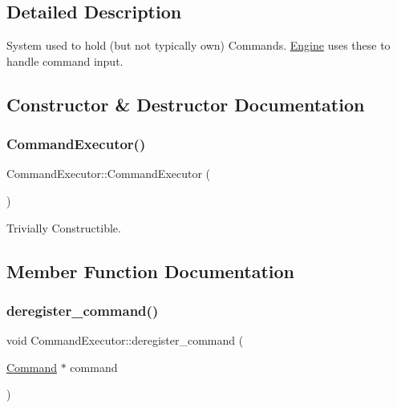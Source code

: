 \subsection{Detailed Description}
System used to hold (but not typically own) Commands. \mbox{\hyperlink{class_engine}{Engine}} uses these to handle command input. 

\subsection{Constructor \& Destructor Documentation}
\mbox{\label{class_command_executor_aad0efdb2a1882ae006083e69de948dee}} 
\subsubsection{\texorpdfstring{Command\+Executor()}{CommandExecutor()}}
{\footnotesize\ttfamily Command\+Executor\+::\+Command\+Executor (\begin{DoxyParamCaption}{ }\end{DoxyParamCaption})\hspace{0.3cm}{\ttfamily [default]}}

Trivially Constructible. 

\subsection{Member Function Documentation}
\mbox{\label{class_command_executor_a6f99990af551c26ced617d0c58720c74}} 
\subsubsection{\texorpdfstring{deregister\+\_\+command()}{deregister\_command()}\hspace{0.1cm}{\footnotesize\ttfamily [1/2]}}
{\footnotesize\ttfamily void Command\+Executor\+::deregister\+\_\+command (\begin{DoxyParamCaption}\item[{\mbox{\hyperlink{class_command}{Command}} $\ast$}]{command }\end{DoxyParamCaption})}

